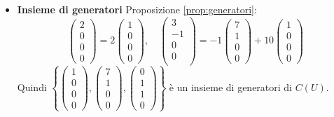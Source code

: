 \documentclass[a4paper]{article}
\theoremstyle{break}
\theoremstyle{break}
\theoremstyle{break}
\theoremstyle{break}
\begin{document}
\begin{example}
\begin{itemize}
   \item \textbf{Insieme di generatori} Proposizione \ref{prop:generatori}:
     \[
     \begin{pmatrix} 
       2\\
       0\\
       0\\
       0
     \end{pmatrix} 
     =
     2 \begin{pmatrix} 1\\0\\0\\0 \end{pmatrix}, \quad
     \begin{pmatrix} 
       3\\
       -1\\
       0\\
       0\\
     \end{pmatrix} 
     =
     -1 \begin{pmatrix} 7\\1\\0\\0 \end{pmatrix} +
     10 \begin{pmatrix} 1\\0\\0\\0 \end{pmatrix}
     \] 
     Quindi \( \left\{ \begin{pmatrix} 
         1\\0\\0\\0
     \end{pmatrix},
     \begin{pmatrix} 
       7\\1\\0\\0
     \end{pmatrix} ,
     \begin{pmatrix} 
       0\\1\\1\\0
     \end{pmatrix} 
   \right\}  \) è un insieme di generatori di \( C(U) \).
  \end{itemize}
\end{example}
\end{document}
